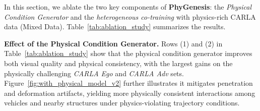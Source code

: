 \documentclass[runningheads]{llncs}
\begin{document}

\begin{table}[tb]
\centering
\vskip -0.1in
\caption{Ablation study. ``Mixed Data'' indicates co-training our heterogeneous dataset, and ``Phy-Model'' denotes the integration of our Physical Condition generator. The best results are highlighted in \textbf{bold}.}
\vskip -0.1in
\label{tab:ablation_study}
\end{table}

In this section, we ablate the two key components of \textbf{PhyGenesis}: the \textit{Physical Condition Generator} and the \textit{heterogeneous co-training} with physics-rich CARLA data (Mixed Data). Table~\ref{tab:ablation_study} summarizes the results. 

\noindent\textbf{Effect of the Physical Condition Generator.}
Rows (1) and (2) in Table~\ref{tab:ablation_study} show that the physical condition generator improves both visual quality and physical consistency, with the largest gains on the physically challenging \textit{CARLA Ego} and \textit{CARLA Adv} sets. Figure~\ref{fig:with_physical_model_v2} further illustrates it mitigates penetration and deformation artifacts, yielding more physically consistent interactions among vehicles and nearby structures under physics-violating trajectory conditions.
\end{document}
